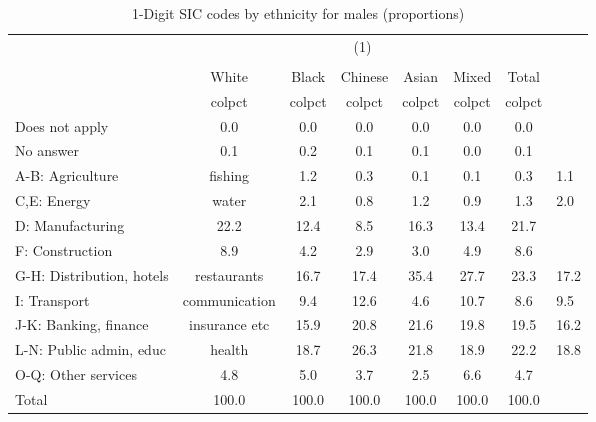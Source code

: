 \begin{table}[htbp]\centering
\def\sym#1{\ifmmode^{#1}\else\(^{#1}\)\fi}
\caption{1-Digit SIC codes by ethnicity for males (proportions)}
\begin{tabular}{l*{6}{c}}
\hline\hline
          &                                    \\
          &                                       \\
          &    White&    Black&  Chinese&    Asian&    Mixed&    Total\\
          &   colpct&   colpct&   colpct&   colpct&   colpct&   colpct\\
\hline
Does not apply&      0.0&      0.0&      0.0&      0.0&      0.0&      0.0\\
No answer &      0.1&      0.2&      0.1&      0.1&      0.0&      0.1\\
A-B: Agriculture & fishing&      1.2&      0.3&      0.1&      0.1&      0.3&      1.1\\
C,E: Energy & water&      2.1&      0.8&      1.2&      0.9&      1.3&      2.0\\
D: Manufacturing&     22.2&     12.4&      8.5&     16.3&     13.4&     21.7\\
F: Construction&      8.9&      4.2&      2.9&      3.0&      4.9&      8.6\\
G-H: Distribution, hotels & restaurants&     16.7&     17.4&     35.4&     27.7&     23.3&     17.2\\
I: Transport & communication&      9.4&     12.6&      4.6&     10.7&      8.6&      9.5\\
J-K: Banking, finance & insurance etc&     15.9&     20.8&     21.6&     19.8&     19.5&     16.2\\
L-N: Public admin, educ & health&     18.7&     26.3&     21.8&     18.9&     22.2&     18.8\\
O-Q: Other services&      4.8&      5.0&      3.7&      2.5&      6.6&      4.7\\
Total     &    100.0&    100.0&    100.0&    100.0&    100.0&    100.0\\
\hline\hline
\end{tabular}
\end{table}
